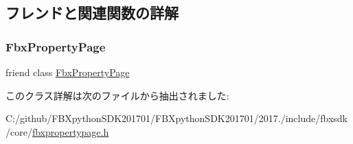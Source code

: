 \subsection{フレンドと関連関数の詳解}
\mbox{\label{class_fbx_property_entry_ad8065889ce44304e7cc811caf583781e}} 
\subsubsection{\texorpdfstring{Fbx\+Property\+Page}{FbxPropertyPage}}
{\footnotesize\ttfamily friend class \hyperlink{class_fbx_property_page}{Fbx\+Property\+Page}\hspace{0.3cm}{\ttfamily [friend]}}



このクラス詳解は次のファイルから抽出されました\+:\begin{DoxyCompactItemize}
\item 
C\+:/github/\+F\+B\+Xpython\+S\+D\+K201701/\+F\+B\+Xpython\+S\+D\+K201701/2017./include/fbxsdk/core/\hyperlink{fbxpropertypage_8h}{fbxpropertypage.\+h}\end{DoxyCompactItemize}
